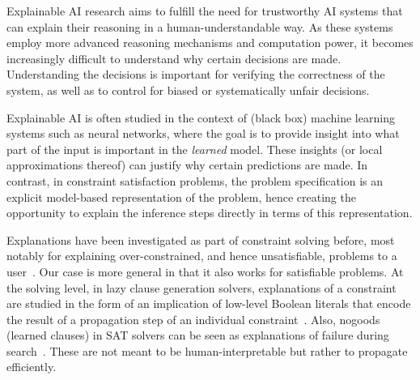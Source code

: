 

Explainable AI research aims to fulfill the need for trustworthy AI systems that can explain their reasoning in a human-understandable way. 
As these systems employ more advanced reasoning mechanisms and computation power, it becomes increasingly difficult to understand why certain decisions are made. 
Understanding the decisions is important for verifying the correctness of the system, as well as to control for biased or systematically unfair decisions.

Explainable AI is often studied in the context of (black box) machine learning systems such as neural networks, where the goal is to provide insight into what part of the input is important in the \textit{learned} model. These insights (or local approximations thereof) can justify why certain predictions are made. In contrast, in constraint satisfaction problems, the problem specification is an explicit model-based representation of the problem, hence creating the opportunity to explain the inference steps directly in terms of this representation.

Explanations have been investigated as part of constraint solving before, most notably for explaining over-constrained, and hence unsatisfiable, problems to a user~\cite{junker2001quickxplain}. Our case is more general in that it also works for satisfiable problems. At the solving level, in lazy clause generation solvers, explanations of a constraint are studied in the form of an implication of low-level Boolean literals that encode the result of a propagation step of an individual constraint~\cite{feydy2009lazy}. Also, nogoods (learned clauses) in SAT solvers can be seen as explanations of failure during search~\cite{marques2009conflict}. These are not meant to be human-interpretable but rather to propagate efficiently.


